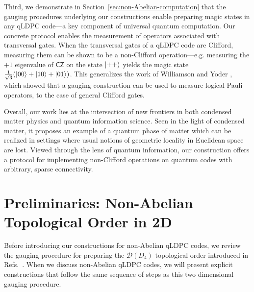\documentclass[aps,prx,reprint,superscriptaddress,nofootinbib]{revtex4-2}
\theoremstyle{definition}
\newcommand{\<}{\langle}
\renewcommand{\>}{\rangle}
\begin{document}
Third, we demonstrate in Section~\ref{sec:non-Abelian-computation} that the gauging procedures underlying our constructions enable preparing magic states in any qLDPC code---a key component of universal quantum computation.
%
Our concrete protocol enables the measurement of operators associated with transversal gates. 
%
When the transversal gates of a qLDPC code are Clifford, measuring them can be shown to be a non-Clifford operation---e.g. measuring the $+1$ eigenvalue of $\mathsf{CZ}$ on the state $\ket{++}$ yields the magic state $\frac{1}{\sqrt{3}} (\ket{00} + \ket{10} + \ket{01})$.
%
This generalizes the work of Williamson and Yoder \cite{williamson_tanner}, which showed that a gauging construction can be used to measure logical Pauli operators, to the case of general Clifford gates.


Overall, our work lies at the intersection of new frontiers in both condensed matter physics and quantum information science.
%
Seen in the light of condensed matter, it proposes an example of a quantum phase of matter which can be realized in settings where usual notions of geometric locality in Euclidean space are lost.
%
Viewed through the lens of quantum information, our construction offers a protocol for implementing non-Clifford operations on quantum codes with arbitrary, sparse connectivity.


\tableofcontents














\section{Preliminaries: Non-Abelian Topological Order in 2D}\label{sec:prelim}

Before introducing our constructions for non-Abelian qLDPC codes, we review the gauging procedure for preparing the $\mathcal{D}(D_4)$ topological order introduced in Refs.~\cite{verresen_efficiently_2022, Tantivasadakarn_2024_LRE, tantivasadakarn_shortest_2023, Hierarchy}.
%
When we discuss non-Abelian qLDPC codes, we will present explicit constructions that follow the same sequence of steps as this two dimensional gauging procedure.

%
\end{document}

